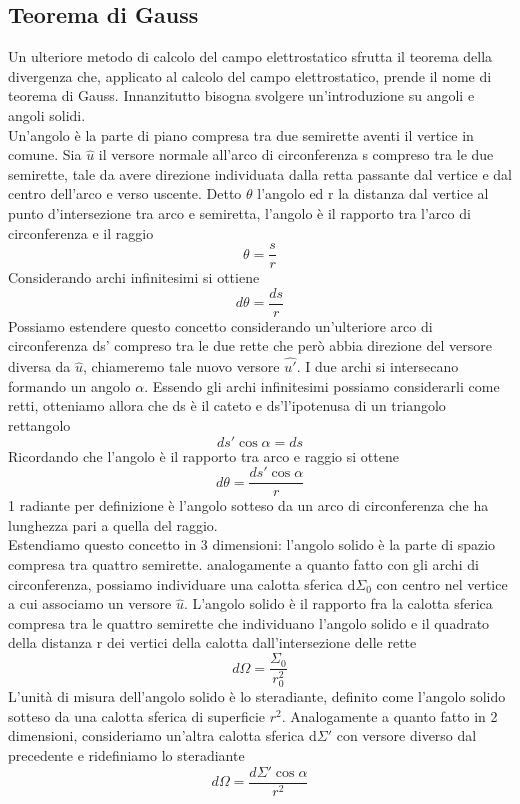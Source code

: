\documentclass[
10pt, %
a4paper, %
oneside, %
headinclude,footinclude, %
BCOR5mm, %
]{scrartcl}
\begin{document}
\subsection{Teorema di Gauss}
Un ulteriore metodo di calcolo del campo elettrostatico sfrutta il teorema della divergenza che, applicato al calcolo del campo elettrostatico, prende il nome di teorema di Gauss. Innanzitutto bisogna svolgere un'introduzione su angoli e angoli solidi.\\
Un'angolo è la parte di piano compresa tra due semirette aventi il vertice in comune. Sia $\hat{u}$ il versore normale all'arco di circonferenza s compreso tra le due semirette, tale da avere direzione individuata dalla retta passante dal vertice e dal centro dell'arco e verso uscente. Detto $\theta$ l'angolo ed r la distanza dal vertice al punto d'intersezione tra arco e semiretta, l'angolo è il rapporto tra l'arco di circonferenza e il raggio 
\[\theta =\frac{s}{r}\]
Considerando archi infinitesimi si ottiene
\[d\theta = \frac{ds}{r}\] 
Possiamo estendere questo concetto considerando un'ulteriore arco di circonferenza ds' compreso tra le due rette che però abbia direzione del versore diversa da $\hat{u}$, chiameremo tale nuovo versore $\hat{u'}$. I due archi si intersecano formando un angolo $\alpha$. Essendo gli archi infinitesimi possiamo considerarli come retti, otteniamo allora che ds è il cateto e ds'l'ipotenusa di un triangolo rettangolo
\[ds' \cos\alpha = ds\]
Ricordando che l'angolo è il rapporto tra arco e raggio si ottene
\[d\theta = \frac{ds'\cos\alpha}{r}\]
1 radiante per definizione è l'angolo sotteso da un arco di circonferenza che ha lunghezza pari a quella del raggio.\\
Estendiamo questo concetto in 3 dimensioni: l'angolo solido è la parte di spazio compresa tra quattro semirette. analogamente a quanto fatto con gli archi di circonferenza, possiamo individuare una calotta sferica d$\Sigma_0$ con centro nel vertice a cui associamo un versore $\hat{u}$. L'angolo solido è il rapporto fra la calotta sferica compresa tra le quattro semirette che individuano l'angolo solido e il quadrato della distanza r dei vertici della calotta dall'intersezione delle rette
\[d\Omega = \frac{\Sigma_0}{r_0^2}\]
L'unità di misura dell'angolo solido è lo steradiante, definito come l'angolo solido sotteso da una calotta sferica di superficie \(r^2\). Analogamente a quanto fatto in 2 dimensioni, consideriamo un'altra calotta sferica d$\Sigma'$ con versore diverso dal precedente e ridefiniamo lo steradiante
\[d\Omega = \frac{d\Sigma'\cos\alpha}{r^2}\] 
\end{document}
